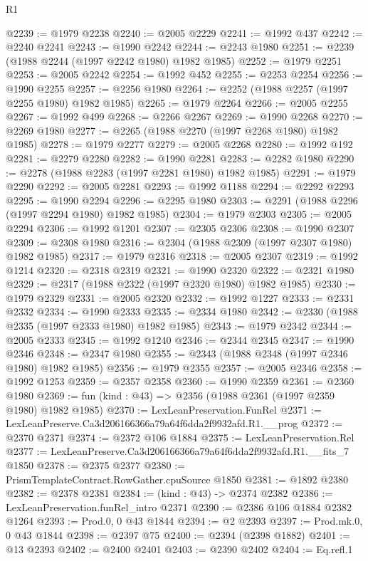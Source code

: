 \begin{lexlean}{R1}
\begin{coremodule}
@2239 := @1979 @2238
@2240 := @2005 @2229
@2241 := @1992 @437
@2242 := @2240 @2241
@2243 := @1990 @2242
@2244 := @2243 @1980
@2251 := @2239 (@1988 @2244 (@1997 @2242 @1980) @1982 @1985)
@2252 := @1979 @2251
@2253 := @2005 @2242
@2254 := @1992 @452
@2255 := @2253 @2254
@2256 := @1990 @2255
@2257 := @2256 @1980
@2264 := @2252 (@1988 @2257 (@1997 @2255 @1980) @1982 @1985)
@2265 := @1979 @2264
@2266 := @2005 @2255
@2267 := @1992 @499
@2268 := @2266 @2267
@2269 := @1990 @2268
@2270 := @2269 @1980
@2277 := @2265 (@1988 @2270 (@1997 @2268 @1980) @1982 @1985)
@2278 := @1979 @2277
@2279 := @2005 @2268
@2280 := @1992 @192
@2281 := @2279 @2280
@2282 := @1990 @2281
@2283 := @2282 @1980
@2290 := @2278 (@1988 @2283 (@1997 @2281 @1980) @1982 @1985)
@2291 := @1979 @2290
@2292 := @2005 @2281
@2293 := @1992 @1188
@2294 := @2292 @2293
@2295 := @1990 @2294
@2296 := @2295 @1980
@2303 := @2291 (@1988 @2296 (@1997 @2294 @1980) @1982 @1985)
@2304 := @1979 @2303
@2305 := @2005 @2294
@2306 := @1992 @1201
@2307 := @2305 @2306
@2308 := @1990 @2307
@2309 := @2308 @1980
@2316 := @2304 (@1988 @2309 (@1997 @2307 @1980) @1982 @1985)
@2317 := @1979 @2316
@2318 := @2005 @2307
@2319 := @1992 @1214
@2320 := @2318 @2319
@2321 := @1990 @2320
@2322 := @2321 @1980
@2329 := @2317 (@1988 @2322 (@1997 @2320 @1980) @1982 @1985)
@2330 := @1979 @2329
@2331 := @2005 @2320
@2332 := @1992 @1227
@2333 := @2331 @2332
@2334 := @1990 @2333
@2335 := @2334 @1980
@2342 := @2330 (@1988 @2335 (@1997 @2333 @1980) @1982 @1985)
@2343 := @1979 @2342
@2344 := @2005 @2333
@2345 := @1992 @1240
@2346 := @2344 @2345
@2347 := @1990 @2346
@2348 := @2347 @1980
@2355 := @2343 (@1988 @2348 (@1997 @2346 @1980) @1982 @1985)
@2356 := @1979 @2355
@2357 := @2005 @2346
@2358 := @1992 @1253
@2359 := @2357 @2358
@2360 := @1990 @2359
@2361 := @2360 @1980
@2369 := fun (kind : @43) => @2356 (@1988 @2361 (@1997 @2359 @1980) @1982 @1985)
@2370 := LexLeanPreservation.FunRel
@2371 := LexLeanPreserve.Ca3d206166366a79a64f6dda2f9932afd.R1.__prog
@2372 := @2370 @2371
@2374 := @2372 @106 @1884
@2375 := LexLeanPreservation.Rel
@2377 := LexLeanPreserve.Ca3d206166366a79a64f6dda2f9932afd.R1.__fits_7 @1850
@2378 := @2375 @2377
@2380 := PrismTemplateContract.RowGather.cpuSource @1850
@2381 := @1892 @2380
@2382 := @2378 @2381
@2384 := (kind : @43) -> @2374 @2382
@2386 := LexLeanPreservation.funRel_intro @2371
@2390 := @2386 @106 @1884 @2382 @1264
@2393 := Prod.{0, 0} @43 @1844
@2394 := @2 @2393
@2397 := Prod.mk.{0, 0} @43 @1844
@2398 := @2397 @75
@2400 := @2394 (@2398 @1882)
@2401 := @13 @2393
@2402 := @2400 @2401
@2403 := @2390 @2402
@2404 := Eq.refl.{1}

\end{coremodule}
\end{lexlean}
